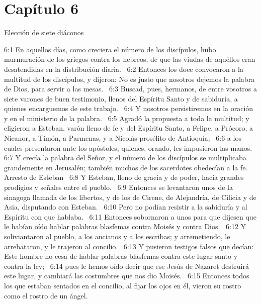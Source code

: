 \section*{Capítulo 6}
Elección de siete diáconos 

6:1 En aquellos días, como creciera el número de los discípulos, hubo murmuración de los griegos contra los hebreos, de que las viudas de aquéllos eran desatendidas en la distribución diaria.  
6:2 Entonces los doce convocaron a la multitud de los discípulos, y dijeron: No es justo que nosotros dejemos la palabra de Dios, para servir a las mesas.  
6:3 Buscad, pues, hermanos, de entre vosotros a siete varones de buen testimonio, llenos del Espíritu Santo y de sabiduría, a quienes encarguemos de este trabajo.  
6:4 Y nosotros persistiremos en la oración y en el ministerio de la palabra.  
6:5 Agradó la propuesta a toda la multitud; y eligieron a Esteban, varón lleno de fe y del Espíritu Santo, a Felipe, a Prócoro, a Nicanor, a Timón, a Parmenas, y a Nicolás prosélito de Antioquía;  
6:6 a los cuales presentaron ante los apóstoles, quienes, orando, les impusieron las manos.  
6:7 Y crecía la palabra del Señor, y el número de los discípulos se multiplicaba grandemente en Jerusalén; también muchos de los sacerdotes obedecían a la fe.  
Arresto de Esteban  
6:8 Y Esteban, lleno de gracia y de poder, hacía grandes prodigios y señales entre el pueblo.  
6:9 Entonces se levantaron unos de la sinagoga llamada de los libertos, y de los de Cirene, de Alejandría, de Cilicia y de Asia, disputando con Esteban.  
6:10 Pero no podían resistir a la sabiduría y al Espíritu con que hablaba.  
6:11 Entonces sobornaron a unos para que dijesen que le habían oído hablar palabras blasfemas contra Moisés y contra Dios.  
6:12 Y soliviantaron al pueblo, a los ancianos y a los escribas; y arremetiendo, le arrebataron, y le trajeron al concilio.  
6:13 Y pusieron testigos falsos que decían: Este hombre no cesa de hablar palabras blasfemas contra este lugar santo y contra la ley;  
6:14 pues le hemos oído decir que ese Jesús de Nazaret destruirá este lugar, y cambiará las costumbres que nos dio Moisés.  
6:15 Entonces todos los que estaban sentados en el concilio, al fijar los ojos en él, vieron su rostro como el rostro de un ángel.  
